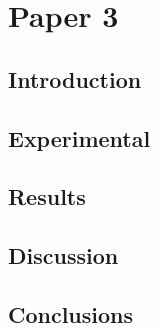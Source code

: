 


\chapter{Paper 3}

\section{Introduction}
\lipsum

\section{Experimental}
\lipsum

\section{Results}
\lipsum

\section{Discussion}
\lipsum

\section{Conclusions}
\lipsum
